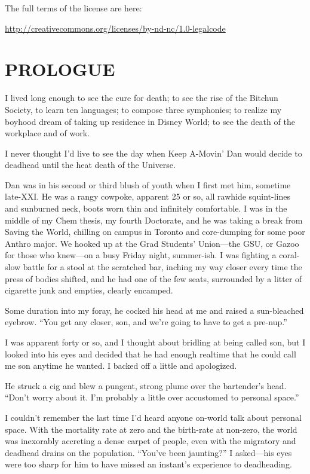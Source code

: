 The full terms of the license are here:

\href{http://creativecommons.org/licenses/by-nd-nc/1.0-legalcode}{http://creativecommons.org/licenses/by-nd-nc/1.0-legalcode}

\section{PROLOGUE}

I lived long enough to see the cure for death; to see the rise of
the Bitchun Society, to learn ten languages; to compose three
symphonies; to realize my boyhood dream of taking up residence in
Disney World; to see the death of the workplace and of work.

I never thought I'd live to see the day when Keep A-Movin' Dan
would decide to deadhead until the heat death of the Universe.

Dan was in his second or third blush of youth when I first met him,
sometime late-XXI. He was a rangy cowpoke, apparent 25 or so, all
rawhide squint-lines and sunburned neck, boots worn thin and
infinitely comfortable. I was in the middle of my Chem thesis, my
fourth Doctorate, and he was taking a break from Saving the World,
chilling on campus in Toronto and core-dumping for some poor Anthro
major. We hooked up at the Grad Students' Union—the GSU, or Gazoo
for those who knew—on a busy Friday night, summer-ish. I was
fighting a coral-slow battle for a stool at the scratched bar,
inching my way closer every time the press of bodies shifted, and
he had one of the few seats, surrounded by a litter of cigarette
junk and empties, clearly encamped.

Some duration into my foray, he cocked his head at me and raised a
sun-bleached eyebrow. “You get any closer, son, and we're going to
have to get a pre-nup.”

I was apparent forty or so, and I thought about bridling at being
called son, but I looked into his eyes and decided that he had
enough realtime that he could call me son anytime he wanted. I
backed off a little and apologized.

He struck a cig and blew a pungent, strong plume over the
bartender's head. “Don't worry about it. I'm probably a little over
accustomed to personal space.”

I couldn't remember the last time I'd heard anyone on-world talk
about personal space. With the mortality rate at zero and the
birth-rate at non-zero, the world was inexorably accreting a dense
carpet of people, even with the migratory and deadhead drains on
the population. “You've been jaunting?” I asked—his eyes were too
sharp for him to have missed an instant's experience to
deadheading.

